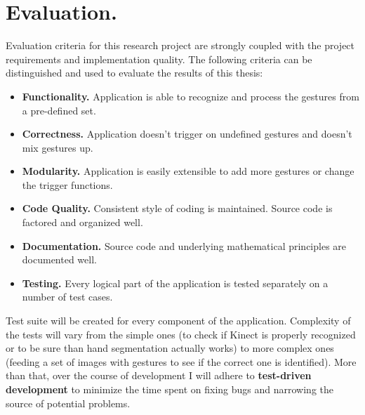 \documentclass[a4paper,11pt,oneside]{article}
\begin{document}
  \section{Evaluation.}
  
  Evaluation criteria for this research project are strongly coupled with the project requirements and implementation quality. The following criteria can be distinguished and used to evaluate the results of this thesis:
  
  \begin{itemize}
  \item \textbf{Functionality.} Application is able to recognize and process the gestures from a pre-defined set. 
  \item \textbf{Correctness.} Application doesn't trigger on undefined gestures and doesn't mix gestures up.
   \item \textbf{Modularity.} Application is easily extensible to add more gestures or change the trigger functions. 
  \item \textbf{Code Quality.} Consistent style of coding is maintained. Source code is factored and organized well.
  \item \textbf{Documentation.} Source code and underlying mathematical principles are documented well.
  \item \textbf{Testing.} Every logical part of the application is tested separately on a number of test cases. 
  \end{itemize}
 
  Test suite will be created for every component of the application. Complexity of the tests will vary from the simple ones (to check if Kinect is properly recognized or to be sure than hand segmentation actually works) to more complex ones (feeding a set of images with gestures to see if the correct one is identified). More than that, over the course of development I will adhere to \textbf{test-driven development} to minimize the time spent on fixing bugs and narrowing the source of potential problems.
\end{document}
